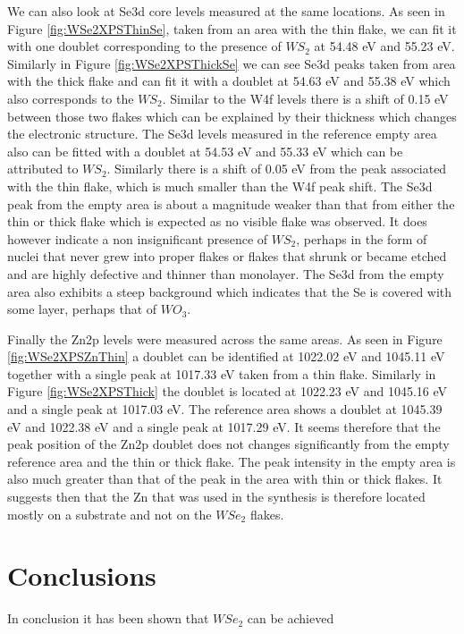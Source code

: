 We can also look at Se3d core levels measured at the same locations. As seen in Figure \ref{fig:WSe2XPSThinSe}, taken from an area with the thin flake, we can fit it with one doublet corresponding to the presence of $WS_2$ at 54.48 eV and 55.23 eV. Similarly in Figure \ref{fig:WSe2XPSThickSe} we can see Se3d peaks taken from area with the thick flake and can fit it with a doublet at 54.63 eV and 55.38 eV which also corresponds to the $WS_2$. Similar to the W4f levels there is a shift of 0.15 eV between those two flakes which can be explained by their thickness which changes the electronic structure. The Se3d levels measured in the reference empty area also can be fitted with a doublet at 54.53 eV and 55.33 eV which can be attributed to $WS_2$. Similarly there is a shift of 0.05 eV from the peak associated with the thin flake, which is much smaller than the W4f peak shift. The Se3d peak from the empty area is about a magnitude weaker than that from either the thin or thick flake which is expected as no visible flake was observed. It does however indicate a non insignificant presence of $WS_2$, perhaps in the form of nuclei that never grew into proper flakes or flakes that shrunk or became etched and are highly defective and thinner than monolayer. The Se3d from the empty area also exhibits a steep background which indicates that the Se is covered with some layer, perhaps that of $WO_3$. 

Finally the Zn2p levels were measured across the same areas. As seen in Figure \ref{fig:WSe2XPSZnThin} a doublet can be identified at 1022.02 eV and 1045.11 eV together with a single peak at 1017.33 eV taken from a thin flake. Similarly in Figure \ref{fig:WSe2XPSThick} the doublet is located at 1022.23 eV and 1045.16 eV and a single peak at 1017.03 eV. The reference area shows a doublet at 1045.39 eV and 1022.38 eV and a single peak at 1017.29 eV. It seems therefore that the peak position of the Zn2p doublet does not changes significantly from the empty reference area and the thin or thick flake. The peak intensity in the empty area is also much greater than that of the peak in the area with thin or thick flakes. It suggests then that the Zn that was used in the synthesis is therefore located mostly on a substrate and not on the $WSe_2$ flakes.

\section{Conclusions}

In conclusion it has been shown that $WSe_2$ can be achieved 
